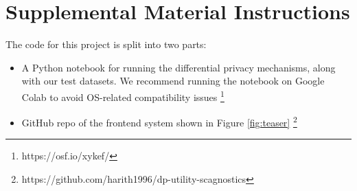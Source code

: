 \documentclass[journal]{vgtc}                     %
\begin{document}




\section{Supplemental Material Instructions}
\label{sec:supplement_inst}
The code for this project is split into two parts:
\begin{itemize}
    \item A Python notebook for running the differential privacy mechanisms, along with our test datasets. We recommend running the notebook on Google Colab to avoid OS-related compatibility issues \footnote[2]{https://osf.io/xykef/}
    \item GitHub repo of the frontend system shown in Figure \ref{fig:teaser} \footnote[3]{https://github.com/harith1996/dp-utility-scagnostics}
\end{itemize}
\end{document}
